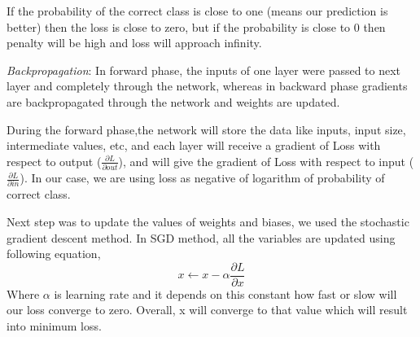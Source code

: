 \documentclass[conference]{IEEEtran}
\begin{document}
If the probability of the correct class is close to one (means our prediction is better) then the loss is close to zero, but if the probability is close to 0 then penalty will be high and loss will approach infinity.




\emph{Backpropagation}\cite{CNNPart2_VZ_2020}: In forward phase, the inputs of one layer were passed to next layer and completely through the network, whereas in backward phase gradients are backpropagated through the network and weights are updated.

During the forward phase,the network will store the data like inputs, input size, intermediate values, etc,
and each layer will receive a gradient of Loss with respect to output ($\frac{\partial L}{\partial out}$), and will give the gradient of Loss with respect to input ($\frac{\partial L}{\partial in}$). In our case, we are using loss as negative of logarithm of probability of correct class. 

Next step was to update the values of weights and biases, we used the stochastic gradient descent method. In SGD method, all the variables are updated using following equation,
\begin{equation}
x  \longleftarrow x -\alpha \frac{\partial L}{\partial x}
\end{equation}
Where $\alpha$ is learning rate and it depends on this constant how fast or slow will our loss converge to zero. Overall, x will converge to that value which will result into minimum loss.
\end{document}
